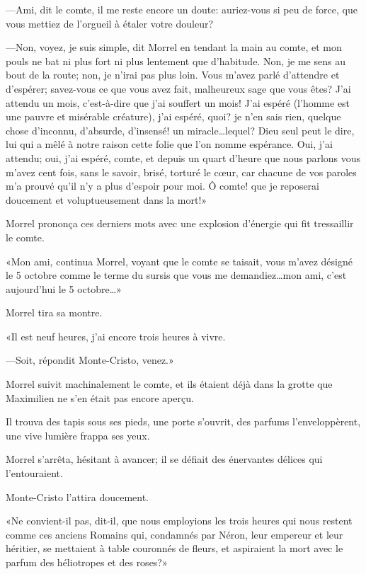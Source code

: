 —Ami, dit le comte, il me reste encore un doute: auriez-vous si peu de force, que vous mettiez de l'orgueil à étaler votre douleur? 

—Non, voyez, je suis simple, dit Morrel en tendant la main au comte, et mon pouls ne bat ni plus fort ni plus lentement que d'habitude. Non, je me sens au bout de la route; non, je n'irai pas plus loin. Vous m'avez parlé d'attendre et d'espérer; savez-vous ce que vous avez fait, malheureux sage que vous êtes? J'ai attendu un mois, c'est-à-dire que j'ai souffert un mois! J'ai espéré (l'homme est une pauvre et misérable créature), j'ai espéré, quoi? je n'en sais rien, quelque chose d'inconnu, d'absurde, d'insensé! un miracle\dots lequel? Dieu seul peut le dire, lui qui a mêlé à notre raison cette folie que l'on nomme espérance. Oui, j'ai attendu; oui, j'ai espéré, comte, et depuis un quart d'heure que nous parlons vous m'avez cent fois, sans le savoir, brisé, torturé le cœur, car chacune de vos paroles m'a prouvé qu'il n'y a plus d'espoir pour moi. Ô comte! que je reposerai doucement et voluptueusement dans la mort!» 

Morrel prononça ces derniers mots avec une explosion d'énergie qui fit tressaillir le comte. 

«Mon ami, continua Morrel, voyant que le comte se taisait, vous m'avez désigné le 5 octobre comme le terme du sursis que vous me demandiez\dots mon ami, c'est aujourd'hui le 5 octobre\dots» 

Morrel tira sa montre. 

«Il est neuf heures, j'ai encore trois heures à vivre. 

—Soit, répondit Monte-Cristo, venez.» 

Morrel suivit machinalement le comte, et ils étaient déjà dans la grotte que Maximilien ne s'en était pas encore aperçu. 

Il trouva des tapis sous ses pieds, une porte s'ouvrit, des parfums l'enveloppèrent, une vive lumière frappa ses yeux. 

Morrel s'arrêta, hésitant à avancer; il se défiait des énervantes délices qui l'entouraient. 

Monte-Cristo l'attira doucement. 

«Ne convient-il pas, dit-il, que nous employions les trois heures qui nous restent comme ces anciens Romains qui, condamnés par Néron, leur empereur et leur héritier, se mettaient à table couronnés de fleurs, et aspiraient la mort avec le parfum des héliotropes et des roses?» 

